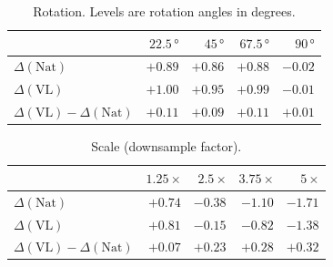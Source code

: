 \documentclass{article}
\begin{document}
\begin{table}[h]
  \centering
  \small
  \begin{tabular}{l r r r r}
    \toprule
    & $22.5\,\mathrm{°}$ & $45\,\mathrm{°}$ & $67.5\,\mathrm{°}$ & $90\,\mathrm{°}$ \\
    \midrule
    $\Delta(\mathrm{Nat})$ & $+0.89$ & $+0.86$ & $+0.88$ & $-0.02$ \\
    $\Delta(\mathrm{VL})$ & $+1.00$ & $+0.95$ & $+0.99$ & $-0.01$ \\
    $\Delta(\mathrm{VL}) - \Delta(\mathrm{Nat})$ & $+0.11$ & $+0.09$ & $+0.11$ & $+0.01$ \\
    \bottomrule
  \end{tabular}
  \caption{Rotation. Levels are rotation angles in degrees.}
  \label{tab:inv_rot}
\end{table}

\begin{table}[h]
  \centering
  \small
  \begin{tabular}{l r r r r}
    \toprule
    & $1.25\,\mathrm{×}$ & $2.5\,\mathrm{×}$ & $3.75\,\mathrm{×}$ & $5\,\mathrm{×}$ \\
    \midrule
    $\Delta(\mathrm{Nat})$ & $+0.74$ & $-0.38$ & $-1.10$ & $-1.71$ \\
    $\Delta(\mathrm{VL})$ & $+0.81$ & $-0.15$ & $-0.82$ & $-1.38$ \\
    $\Delta(\mathrm{VL}) - \Delta(\mathrm{Nat})$ & $+0.07$ & $+0.23$ & $+0.28$ & $+0.32$ \\
    \bottomrule
  \end{tabular}
  \caption{Scale (downsample factor).}
  \label{tab:inv_scale}
\end{table}
\end{document}
